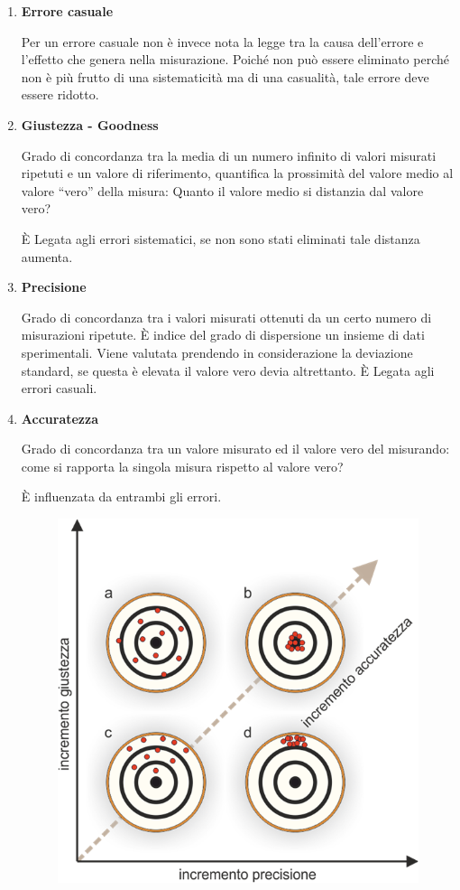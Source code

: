 \documentclass[a4paper, 15pt]{article}
\begin{document}
\begin{adjustwidth}{2in}{}
\begin{enumerate}
\item \textbf{Errore casuale} 

	Per un errore casuale non è invece nota la legge tra la causa dell'errore e l’effetto che genera nella misurazione. Poiché non può essere eliminato perché non è più frutto di una sistematicità ma di una casualità, tale errore deve essere ridotto.
	
\item \textbf{Giustezza - Goodness} 

	Grado di concordanza tra la media di un numero infinito di
	valori misurati ripetuti e un valore di riferimento, quantifica la prossimità del valore medio al valore “vero” della
	misura: Quanto il valore medio si distanzia dal valore vero? 
	
	È Legata agli errori sistematici, se non sono stati eliminati tale distanza aumenta.
	
\item \textbf{Precisione} 

	Grado di concordanza tra i valori misurati ottenuti da un certo
	numero di misurazioni ripetute. È indice del grado di dispersione un insieme di
	dati sperimentali. Viene valutata prendendo in considerazione la deviazione
	standard, se questa è elevata il valore vero devia altrettanto. È Legata agli errori casuali.
\newpage	
\item \textbf{Accuratezza} 

	Grado di concordanza tra un valore misurato ed il valore vero
	del misurando: come si rapporta la singola misura rispetto al valore vero? 
	
	È influenzata da entrambi gli errori. 	
\begin{figure}[H]
	\centering
	\includegraphics[width=0.5\linewidth]{fig/screenshot015}
	\label{fig:screenshot015}
\end{figure}


\end{enumerate}
\end{adjustwidth}
\end{document}
